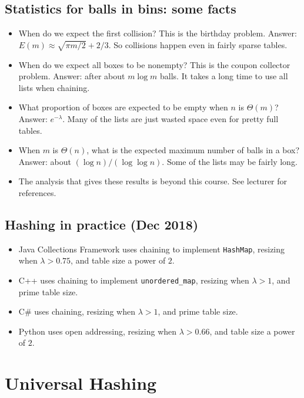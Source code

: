 \section*{Statistics for balls in bins: some facts}
\begin{itemize}
\item When do we expect the first collision? This is the 
{birthday problem}. Answer: $E(m) \approx \sqrt{\pi m/2} + 2/3$.
So collisions happen even in fairly sparse tables.
\item When do we expect all boxes to be nonempty? This is the 
{coupon collector problem}. Answer: after about $m \log m$ balls. 
It takes a long time to use all lists when chaining.
\item What proportion of boxes are expected to be empty when $n$ is $\Theta(m)$? 
Answer: $e^{-\lambda}$. Many of the lists are just wasted space even for 
pretty full tables.
\item When $m$ is $\Theta(n)$, what is the expected maximum number of balls in a box? 
Answer: about $(\log n)/(\log \log n)$. Some of the lists may be fairly long. 
\item The analysis that gives these results is beyond this course. See lecturer for 
references.
\end{itemize}

\section*{Hashing in practice (Dec 2018)}
\begin{itemize}
\item Java Collections Framework uses chaining to implement \texttt{HashMap}, resizing when $\lambda > 0.75$, and table size a power of $2$.
\item C++  uses chaining to implement \texttt{unordered\_map}, resizing when $\lambda >1$, and prime table size.
\item C\# uses chaining, resizing when $\lambda >1$, and prime table size.
\item Python uses open addressing, resizing when $\lambda>0.66$, and table size a power of $2$.
\end{itemize}





\chapter{Universal Hashing} %


